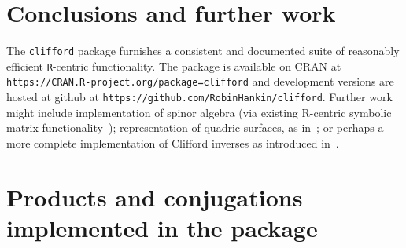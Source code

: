 \documentclass{birkjour}
\theoremstyle{definition}
\theoremstyle{remark}
\numberwithin{equation}{section}
\begin{document}
\section{Conclusions and further work}

The {\tt clifford} package furnishes a consistent and documented suite
of reasonably efficient {\tt R}-centric functionality.  The package is
available on CRAN at
\verb+https://CRAN.R-project.org/package=clifford+ and development
versions are hosted at github at
\verb+https://github.com/RobinHankin/clifford+.  Further work might
include implementation of spinor algebra (via existing R-centric
symbolic matrix
functionality~\cite{hankin2023_jordan,hankin2006_onion});
representation of quadric surfaces, as in~\cite{breuils2018}; or
perhaps a more complete implementation of Clifford inverses as
introduced in~\cite{hitzer2017}.






\appendix
\section{Products and conjugations implemented in the package}
\end{document}
